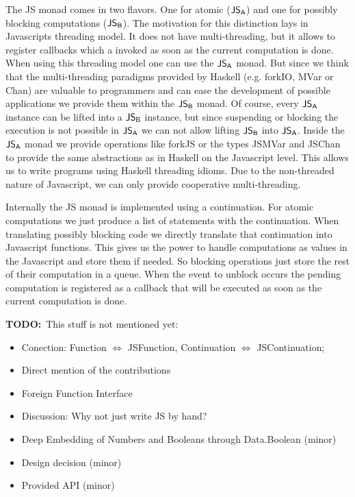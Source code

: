 \documentclass{llncs}
\newcommand{\TODO}[1]{{\textbf{TODO:}\ #1}}
\newcommand{\Src}[1]{{\sf #1}}
\newcommand{\JSA}{\ensuremath{\Src{JS}_\Src{A}}}
\newcommand{\JSB}{\ensuremath{\Src{JS}_\Src{B}}}
\begin{document}
The \Src{JS} monad comes in two flavors. One for atomic
($\JSA$) and one for possibly blocking 
computations ($\JSB$). The motivation for this distinction
lays in Javascripts threading model. It does not have multi-threading,
but it allows to register callbacks which a invoked as soon as the 
current computation is done. 
When using this threading model one can use the $\JSA$ monad.
But since we think that the multi-threading paradigms provided by
Haskell (e.g. \Src{forkIO}, \Src{MVar} or \Src{Chan}) are valuable 
to programmers and can ease the development of possible applications 
we provide them within the $\JSB$ monad.
Of course, every $\JSA$ instance can be lifted into a $\JSB$
instance, but since suspending or blocking the execution is not 
possible in $\JSA$ we can not allow lifting $\JSB$ into $\JSA$.
Inside the $\JSA$ monad we provide operations like \Src{forkJS} 
or the types \Src{JSMVar} and \Src{JSChan} to provide the same
abstractions as in Haskell on the Javascript level. This allows us
to write programs using Haskell threading idioms. Due to 
the non-threaded nature of Javascript, we can only provide 
cooperative multi-threading.

Internally the \Src{JS} monad is implemented using a continuation. For atomic
computations we just produce a list of statements with the continuation. 
When translating possibly blocking code we directly translate that continuation
into Javascript functions. This gives us the power to handle 
computations as values in the Javascript and store them if needed.
So blocking operations just store the rest of their computation in a queue.
When the event to unblock occurs the pending computation is registered 
as a callback that will be executed as soon as the current computation
is done.

\TODO{This stuff is not mentioned yet:}
\begin{itemize}
\item Conection: Function $\Leftrightarrow$ JSFunction, 
                 Continuation $\Leftrightarrow$ JSContinuation;
\item Direct mention of the contributions
\item Foreign Function Interface
\item Discussion: Why not just write JS by hand?
\item Deep Embedding of Numbers and Booleans through Data.Boolean (minor)
\item Design decision (minor)
\item Provided API (minor)
\end{itemize}
\end{document}
